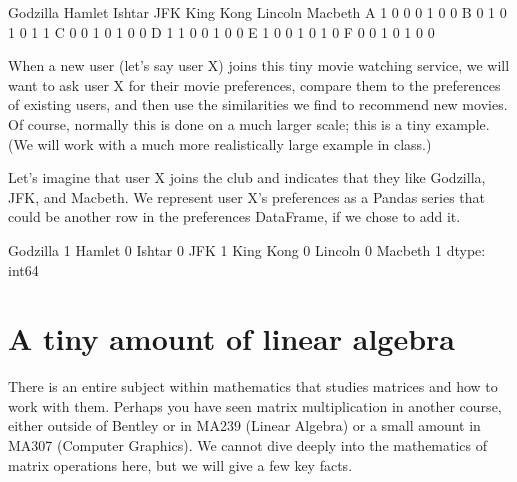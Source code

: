 \documentclass[letterpaper,10pt,english]{sphinxmanual}
\begin{document}
\begin{sphinxVerbatim}[commandchars=\\\{\}]
   Godzilla  Hamlet  Ishtar  JFK  King Kong  Lincoln  Macbeth
A         1       0       0    0          1        0        0
B         0       1       0    1          0        1        1
C         0       0       1    0          1        0        0
D         1       1       0    0          1        0        0
E         1       0       0    1          0        1        0
F         0       0       1    0          1        0        0
\end{sphinxVerbatim}

When a new user (let’s say user X) joins this tiny movie watching service, we will want to ask user X for their movie preferences, compare them to the preferences of existing users, and then use the similarities we find to recommend new movies.  Of course, normally this is done on a much larger scale; this is a tiny example.  (We will work with a much more realistically large example in class.)

Let’s imagine that user X joins the club and indicates that they like Godzilla, JFK, and Macbeth.  We represent user X’s preferences as a Pandas series that could be another row in the preferences DataFrame, if we chose to add it.

\begin{sphinxVerbatim}[commandchars=\\\{\}]
   \PYG{p}{[} \PYG{p}{]}  
\end{sphinxVerbatim}

\begin{sphinxVerbatim}[commandchars=\\\{\}]
Godzilla     1
Hamlet       0
Ishtar       0
JFK          1
King Kong    0
Lincoln      0
Macbeth      1
dtype: int64
\end{sphinxVerbatim}


\section{A tiny amount of linear algebra}
\label{\detokenize{chapter-16-matrices:a-tiny-amount-of-linear-algebra}}
There is an entire subject within mathematics that studies matrices and how to work with them.  Perhaps you have seen matrix multiplication in another course, either outside of Bentley or in MA239 (Linear Algebra) or a small amount in MA307 (Computer Graphics).  We cannot dive deeply into the mathematics of matrix operations here, but we will give a few key facts.
\end{document}
